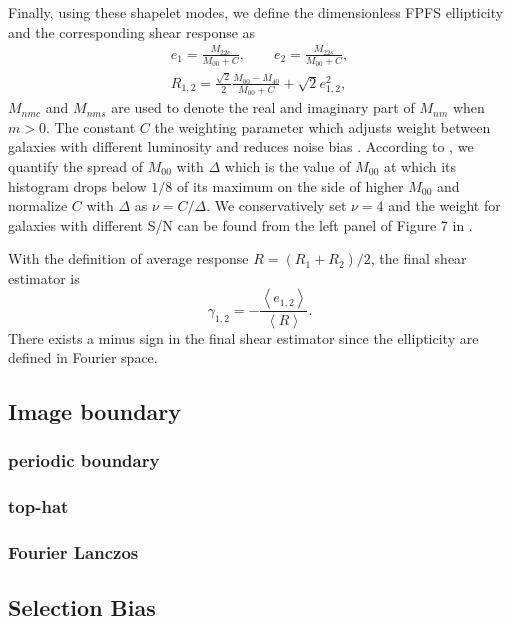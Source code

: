 \documentclass[a4paper,fleqn,usenatbib]{mnras}
\begin{document}
Finally, using these shapelet modes, we define the dimensionless FPFS
ellipticity and the corresponding shear response as
\begin{align}\label{ellipticity_define}
e_1=\frac{M_{22c}}{M_{00}+C},\qquad
e_2=\frac{M_{22s}}{M_{00}+C},\\
R_{1,2}=\frac{\sqrt{2}}{2}\frac{M_{00}-M_{40}}{M_{00}+C}+\sqrt{2}e_{1,2}^2,
\end{align}
$M_{nmc}$ and $M_{nms}$ are used to denote the real and imaginary part of
$M_{nm}$ when $m>0$. The constant $C$ the weighting parameter which adjusts
weight between galaxies with different luminosity and reduces noise bias
\citep{Li18FPFS}. According to \citet{Li18FPFS}, we quantify the spread of
$M_{00}$ with $\Delta$ which is the value of $M_{00}$ at which its histogram
drops below $1/8$ of its maximum on the side of higher $M_{00}$ and normalize
$C$ with $\Delta$ as $\nu = C/\Delta$. We conservatively set $\nu=4$ and the
weight for galaxies with different S/N can be found from the left panel of
Figure 7 in \citet{Li18FPFS}.

With the definition of average response $R= (R_1+R_2)/2$, the final shear
estimator is \begin{equation} \gamma_{1,2} =-\frac{\left\langle e_{1,2}
\right\rangle}{\left\langle R \right\rangle}.  \end{equation} There exists a
minus sign in the final shear estimator since the ellipticity are defined in
Fourier space.

\subsection{Image boundary}
\label{sec:Method-boundary}

\subsubsection{periodic boundary}



\subsubsection{top-hat}


\subsubsection{Fourier Lanczos}



\subsection{Selection Bias}
\end{document}
